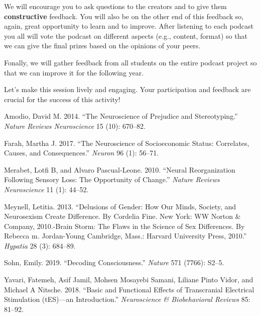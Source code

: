 \documentclass[
  letterpaper,
  DIV=11,
  numbers=noendperiod]{scrreprt}
\newlength{\cslhangindent}
\newenvironment{CSLReferences}[2] %
 {\begin{list}{}{%
  \setlength{\itemindent}{0pt}
  \setlength{\leftmargin}{0pt}
  \setlength{\parsep}{0pt}
  \ifodd #1
   \setlength{\leftmargin}{\cslhangindent}
   \setlength{\itemindent}{-1\cslhangindent}
  \fi
  \setlength{\itemsep}{#2\baselineskip}}}
 {\end{list}}
\begin{document}
We will encourage you to ask questions to the creators and to give them
\textbf{constructive} feedback. You will also be on the other end of
this feedback so, again, great opportunity to learn and to improve.
After listening to each podcast you all will vote the podcast on
different aspects (e.g., content, format) so that we can give the final
prizes based on the opinions of your peers.

Fonally, we will gather feedback from all students on the entire podcast
project so that we can improve it for the following year.

Let's make this session lively and engaging. Your participation and
feedback are crucial for the success of this activity!

\label{refs}
\begin{CSLReferences}{1}{0}
Amodio, David M. 2014. {``The Neuroscience of Prejudice and
Stereotyping.''} \emph{Nature Reviews Neuroscience} 15 (10): 670--82.

Farah, Martha J. 2017. {``The Neuroscience of Socioeconomic Status:
Correlates, Causes, and Consequences.''} \emph{Neuron} 96 (1): 56--71.

Merabet, Lotfi B, and Alvaro Pascual-Leone. 2010. {``Neural
Reorganization Following Sensory Loss: The Opportunity of Change.''}
\emph{Nature Reviews Neuroscience} 11 (1): 44--52.

Meynell, Letitia. 2013. {``Delusions of Gender: How Our Minds, Society,
and Neurosexism Create Difference. By Cordelia Fine. New York: WW Norton
\& Company, 2010.-Brain Storm: The Flaws in the Science of Sex
Differences. By Rebecca m. Jordan-Young Cambridge, Mass.: Harvard
University Press, 2010.''} \emph{Hypatia} 28 (3): 684--89.

Sohn, Emily. 2019. {``Decoding Consciousness.''} \emph{Nature} 571
(7766): S2--5.

Yavari, Fatemeh, Asif Jamil, Mohsen Mosayebi Samani, Liliane Pinto
Vidor, and Michael A Nitsche. 2018. {``Basic and Functional Effects of
Transcranial Electrical Stimulation (tES)---an Introduction.''}
\emph{Neuroscience \& Biobehavioral Reviews} 85: 81--92.

\end{CSLReferences}
\end{document}
